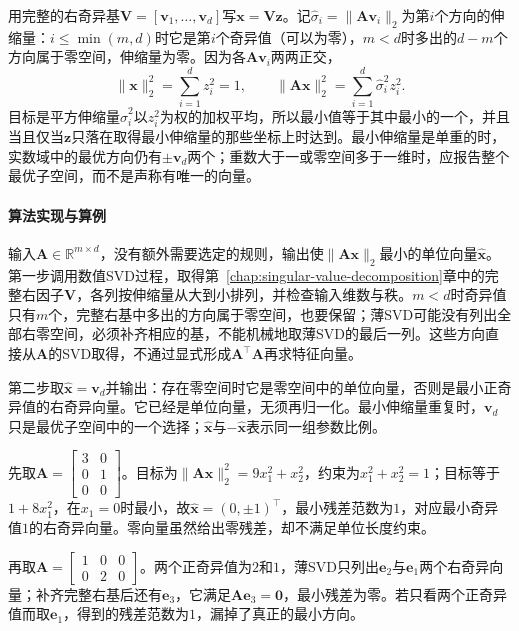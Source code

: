 用完整的右奇异基$\bm V=[\bm v_1,\ldots,\bm v_d]$写$\bm x=\bm V\bm z$。记$\hat\sigma_i=\lVert\bm A\bm v_i\rVert_2$为第$i$个方向的伸缩量：$i\leq\min(m,d)$时它是第$i$个奇异值（可以为零），$m<d$时多出的$d-m$个方向属于零空间，伸缩量为零。因为各$\bm A\bm v_i$两两正交，
\[
 \lVert\bm x\rVert_2^2=\sum_{i=1}^dz_i^2=1,\qquad
 \lVert\bm A\bm x\rVert_2^2=\sum_{i=1}^d\hat\sigma_i^2z_i^2 .
\]
目标是平方伸缩量$\hat\sigma_i^2$以$z_i^2$为权的加权平均，所以最小值等于其中最小的一个，并且当且仅当$\bm z$只落在取得最小伸缩量的那些坐标上时达到。最小伸缩量是单重的时，实数域中的最优方向仍有$\pm\bm v_d$两个；重数大于一或零空间多于一维时，应报告整个最优子空间，而不是声称有唯一的向量。

\paragraph{算法实现与算例}
输入$\bm A\in\mathbb R^{m\times d}$，没有额外需要选定的规则，输出使$\lVert\bm A\bm x\rVert_2$最小的单位向量$\hat{\bm x}$。第一步调用数值SVD过程，取得第~\ref{chap:singular-value-decomposition}章中的完整右因子$\bm V$，各列按伸缩量从大到小排列，并检查输入维数与秩。$m<d$时奇异值只有$m$个，完整右基中多出的方向属于零空间，也要保留；薄SVD可能没有列出全部右零空间，必须补齐相应的基，不能机械地取薄SVD的最后一列。这些方向直接从$\bm A$的SVD取得，不通过显式形成$\bm A^\top\bm A$再求特征向量。

第二步取$\hat{\bm x}=\bm v_d$并输出：存在零空间时它是零空间中的单位向量，否则是最小正奇异值的右奇异向量。它已经是单位向量，无须再归一化。最小伸缩量重复时，$\bm v_d$只是最优子空间中的一个选择；$\hat{\bm x}$与$-\hat{\bm x}$表示同一组参数比例。

\begin{example}[齐次最小二乘的两种情形]
\label{ex:ls-homogeneous-svd-run}
先取$\bm A=\left[\begin{smallmatrix}3&0\\0&1\\0&0\end{smallmatrix}\right]$。目标为$\lVert\bm A\bm x\rVert_2^2=9x_1^2+x_2^2$，约束为$x_1^2+x_2^2=1$；目标等于$1+8x_1^2$，在$x_1=0$时最小，故$\hat{\bm x}=(0,\pm1)^\top$，最小残差范数为$1$，对应最小奇异值$1$的右奇异向量。零向量虽然给出零残差，却不满足单位长度约束。

再取$\bm A=\left[\begin{smallmatrix}1&0&0\\0&2&0\end{smallmatrix}\right]$。两个正奇异值为$2$和$1$，薄SVD只列出$\bm e_2$与$\bm e_1$两个右奇异向量；补齐完整右基后还有$\bm e_3$，它满足$\bm A\bm e_3=\bm0$，最小残差为零。若只看两个正奇异值而取$\bm e_1$，得到的残差范数为$1$，漏掉了真正的最小方向。
\end{example}


